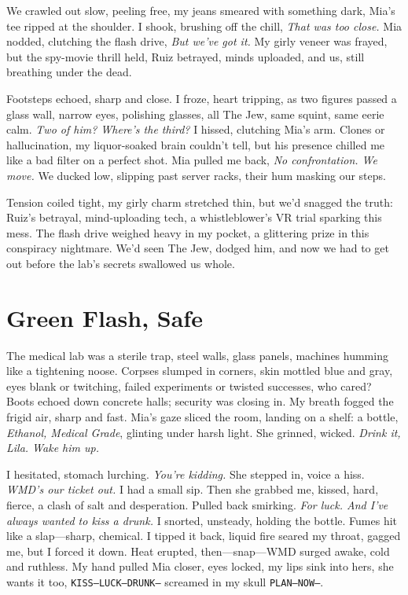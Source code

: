 \documentclass[12pt,oneside]{book}
\newcommand{\note}[1]{\texttt{#1}}
\begin{document}
We crawled out slow, peeling free, my jeans smeared with something dark, Mia’s tee ripped at the shoulder. I shook, brushing off the chill, \textit{That was too close.} Mia nodded, clutching the flash drive, \textit{But we’ve got it.} My girly veneer was frayed, but the spy-movie thrill held, Ruiz betrayed, minds uploaded, and us, still breathing under the dead.

Footsteps echoed, sharp and close. I froze, heart tripping, as two figures passed a glass wall, narrow eyes, polishing glasses, all The Jew, same squint, same eerie calm. \textit{Two of him? Where's the third?} I hissed, clutching Mia’s arm. Clones or hallucination, my liquor-soaked brain couldn’t tell, but his presence chilled me like a bad filter on a perfect shot. Mia pulled me back, \textit{No confrontation. We move.} We ducked low, slipping past server racks, their hum masking our steps.

Tension coiled tight, my girly charm stretched thin, but we’d snagged the truth: Ruiz’s betrayal, mind-uploading tech, a whistleblower’s VR trial sparking this mess. The flash drive weighed heavy in my pocket, a glittering prize in this conspiracy nightmare. We’d seen The Jew, dodged him, and now we had to get out before the lab’s secrets swallowed us whole.

\chapter{Green Flash, Safe}

The medical lab was a sterile trap, steel walls, glass panels, machines humming like a tightening noose. Corpses slumped in corners, skin mottled blue and gray, eyes blank or twitching, failed experiments or twisted successes, who cared? Boots echoed down concrete halls; security was closing in. My breath fogged the frigid air, sharp and fast. Mia’s gaze sliced the room, landing on a shelf: a bottle, \textit{Ethanol, Medical Grade}, glinting under harsh light. She grinned, wicked. \textit{Drink it, Lila. Wake him up.}

I hesitated, stomach lurching. \textit{You’re kidding.} 
She stepped in, voice a hiss. \textit{WMD’s our ticket out.} I had a small sip. Then she grabbed me, kissed, hard, fierce, a clash of salt and desperation. Pulled back smirking. \textit{For luck. And I’ve always wanted to kiss a drunk.}  
I snorted, unsteady, holding the bottle. Fumes hit like a slap—sharp, chemical. I tipped it back, liquid fire seared my throat, gagged me, but I forced it down. Heat erupted, then—snap—WMD surged awake, cold and ruthless. My hand pulled Mia closer, eyes locked, my lips sink into hers, she wants it too, \note {KISS—LUCK—DRUNK—} screamed in my skull \note{PLAN—NOW—}.
\end{document}
